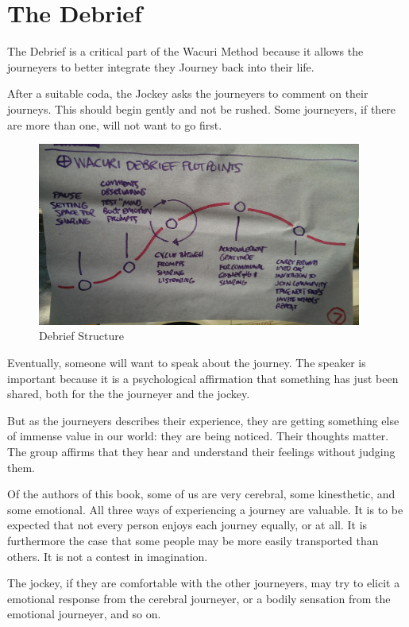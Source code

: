 \documentclass[12pt]{book}
\begin{document}
\chapter{The Debrief}

The Debrief is a critical part of the Wacuri Method
because it allows the journeyers to better integrate
they Journey back into their life.

After a suitable coda, the Jockey asks the journeyers
to comment on their journeys. This should begin gently
and not be rushed. Some journeyers, if there are more than
one, will not want to go first.

\begin{figure}
  \centering
     \includegraphics[width=0.95\textwidth]{WacuriFigures/DebriefStructure.jpg}
     \caption{Debrief Structure}
  \label{fig:closeup}     
\end{figure}


Eventually, someone will want to speak about the journey.
The speaker is important because it is a psychological
affirmation that something has just been shared, both
for the the journeyer and the jockey.

But as the journeyers describes their experience, they
are getting something else of immense value in our world:
they are being noticed. Their thoughts matter. The group
affirms that they hear and understand their feelings
without judging them.

Of the authors of this book, some of us are very cerebral,
some kinesthetic, and some emotional. All three ways of
experiencing a journey are valuable. It is to be expected
that not every person enjoys each journey equally, or at all.
It is furthermore the case that some people may be more easily
transported than others. It is not a contest in imagination.

The jockey, if they are comfortable with the other journeyers,
may try to elicit a emotional response from the cerebral
journeyer, or a bodily sensation from the emotional journeyer,
and so on.
\end{document}
